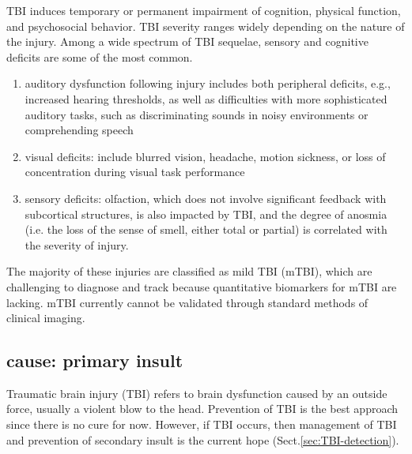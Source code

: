 TBI induces temporary or permanent impairment of cognition, physical function,
and psychosocial behavior. TBI severity ranges widely depending on the nature of
the injury. Among a wide spectrum of TBI sequelae, sensory and cognitive
deficits are some of the most common.
\begin{enumerate}
  \item  auditory dysfunction following injury
includes both peripheral deficits, e.g., increased hearing thresholds,
as well as difficulties with more sophisticated auditory
tasks, such as discriminating sounds in noisy environments or comprehending
speech
  
  \item visual deficits: include blurred vision,
headache, motion sickness, or loss of concentration during visual
task performance
 
 \item sensory deficits: olfaction, which does not involve significant feedback
 with subcortical structures, is also impacted by TBI, and the degree of anosmia
 (i.e. the loss of the sense of smell, either total or partial) is correlated
 with the severity of injury.

\end{enumerate}

The majority of these injuries are classified as mild TBI (mTBI), which are
challenging to diagnose and track because quantitative biomarkers for mTBI are
lacking. mTBI currently cannot be validated through standard methods of clinical
imaging.

\subsection{cause: primary insult}
\label{sec:TBI-primary-insult}

Traumatic brain injury (TBI) refers to brain dysfunction caused by an outside
force, usually a violent blow to the head. Prevention of TBI is the best
approach since there is no cure for now. However, if TBI occurs, then management
of TBI and prevention of secondary insult is the current hope
(Sect.\ref{sec:TBI-detection}).

